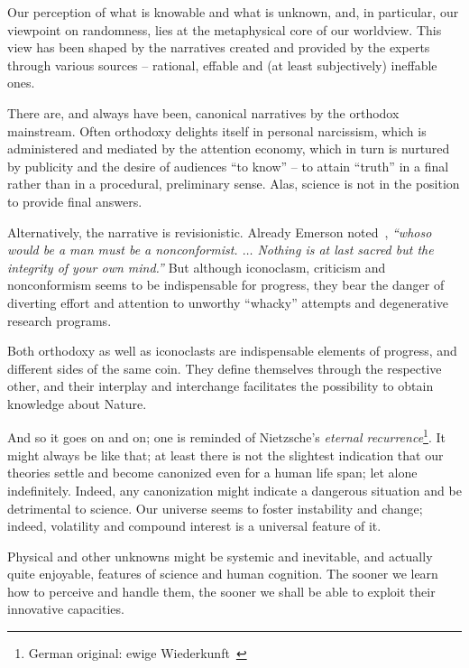 %
%
%

\preface


Our perception of what is knowable and what is unknown,
and, in particular,
our viewpoint on randomness,
lies at the metaphysical core of our worldview.
This view has been shaped by the narratives created and provided by the experts through various sources --
rational, effable and (at least subjectively) ineffable ones.

There are, and always have been, canonical narratives by the orthodox mainstream.
Often orthodoxy delights itself in personal narcissism, which is administered and mediated by the attention economy,
which in turn is nurtured by publicity and the desire of audiences ``to know'' --
to attain ``truth'' in a final rather than in a procedural, preliminary sense.
Alas, science is not in the position to provide final answers.

Alternatively, the narrative is revisionistic.
Already Emerson noted~\cite{Emerson-sr}, {\em ``whoso would be a man must be a nonconformist. $\ldots$
Nothing is at last sacred but the integrity of your  own mind.''}
But although iconoclasm, criticism and nonconformism seems to be indispensable for progress,
they bear the danger of diverting effort and attention to unworthy ``whacky'' attempts and degenerative research programs.

Both orthodoxy as well as iconoclasts are indispensable elements of progress, and different sides of the same coin.
They define themselves through the respective other, and their interplay and interchange facilitates the possibility to obtain knowledge about Nature.

And so it goes on and on; one is reminded of Nietzsche's {\it eternal recurrence}\footnote{German original: ewige Wiederkunft~\cite{Nietzsche-EcceHomo}}.
It might always be like that; at least there is not the slightest indication that our theories settle and become canonized even
for a human life span; let alone indefinitely.
Indeed, any canonization might indicate a dangerous situation and be detrimental to science.
Our universe seems to foster instability and change; indeed, volatility and compound interest is a universal feature of it.

Physical and other unknowns might be systemic and inevitable, and actually quite enjoyable, features of science and human cognition.
The sooner we learn how to perceive and handle them, the sooner we shall be able to exploit their innovative capacities.

